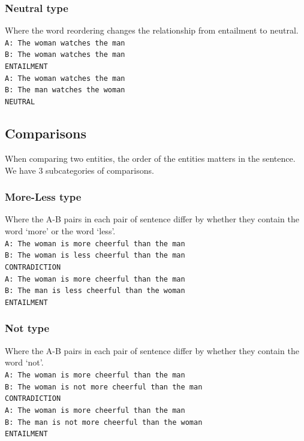 \documentclass[10pt,letterpaper]{article}
\begin{document}
\subsubsection{Neutral type}
Where the word reordering changes the relationship from entailment to neutral.\\
{ \tt A: The woman watches the man \\ B: The woman watches the man \\ ENTAILMENT \\}{\tt A: The woman watches the man \\ B: The man watches the woman \\ NEUTRAL }

\subsection{Comparisons}

When comparing two entities, the order of the entities matters in the sentence. We have 3 subcategories of comparisons.
\subsubsection{More-Less type}
Where the A-B pairs in each pair of sentence differ by whether they contain the word `more' or the word `less'. \\
{\tt A: The woman is more cheerful than the man \\ B: The woman is less cheerful than the man\\ CONTRADICTION \\}{\tt A: The woman is more cheerful than the man \\ B: The man is less cheerful than the woman \\ ENTAILMENT} 

\subsubsection{Not type}
Where the A-B pairs in each pair of sentence differ by whether they contain the word `not'. \\
{\tt A: The woman is more cheerful than the man \\ B: The woman is not more cheerful than the man\\ CONTRADICTION \\}{\tt A: The woman is more cheerful than the man \\ B: The man is not more cheerful than the woman \\ ENTAILMENT} 
\end{document}
